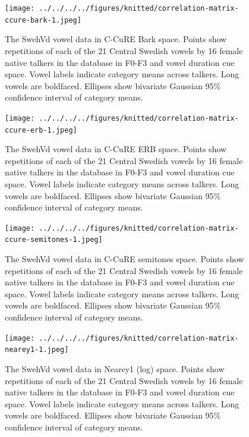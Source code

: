 \documentclass[utf8]{frontiers_suppmat} %
\begin{document}
\begin{figure}[H]
\texttt{[image: ../../../../figures/knitted/correlation-matrix-ccure-bark-1.jpeg]} \caption{The SwehVd vowel data in C-CuRE Bark space. Points show repetitions of each of the 21 Central Swedish vowels by 16 female native talkers in the database in F0-F3 and vowel duration cue space. Vowel labels indicate category means across talkers. Long vowels are boldfaced. Ellipses show bivariate Gaussian 95\% confidence interval of category means.}\label{fig:correlation-matrix-ccure-bark}
\end{figure}



\begin{figure}[H]
\texttt{[image: ../../../../figures/knitted/correlation-matrix-ccure-erb-1.jpeg]} \caption{The SwehVd vowel data in C-CuRE ERB space. Points show repetitions of each of the 21 Central Swedish vowels by 16 female native talkers in the database in F0-F3 and vowel duration cue space. Vowel labels indicate category means across talkers. Long vowels are boldfaced. Ellipses show bivariate Gaussian 95\% confidence interval of category means.}\label{fig:correlation-matrix-ccure-erb}
\end{figure}



\begin{figure}[H]
\texttt{[image: ../../../../figures/knitted/correlation-matrix-ccure-semitones-1.jpeg]} \caption{The SwehVd vowel data in C-CuRE semitones space. Points show repetitions of each of the 21 Central Swedish vowels by 16 female native talkers in the database in F0-F3 and vowel duration cue space. Vowel labels indicate category means across talkers. Long vowels are boldfaced. Ellipses show bivariate Gaussian 95\% confidence interval of category means.}\label{fig:correlation-matrix-ccure-semitones}
\end{figure}



\begin{figure}[H]
\texttt{[image: ../../../../figures/knitted/correlation-matrix-nearey1-1.jpeg]} \caption{The SwehVd vowel data in Nearey1 (log) space. Points show repetitions of each of the 21 Central Swedish vowels by 16 female native talkers in the database in F0-F3 and vowel duration cue space. Vowel labels indicate category means across talkers. Long vowels are boldfaced. Ellipses show bivariate Gaussian 95\% confidence interval of category means.}\label{fig:correlation-matrix-nearey1}
\end{figure}
\end{document}
